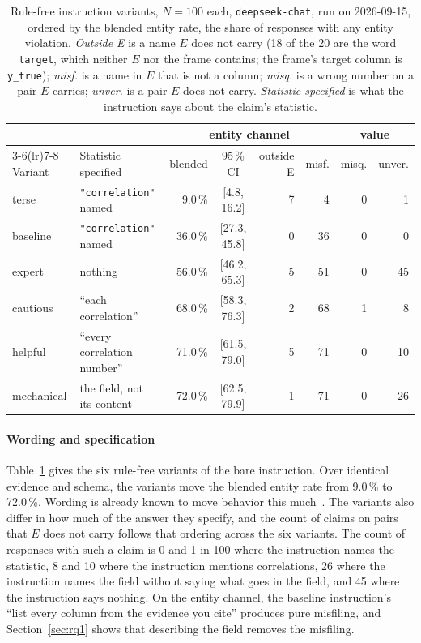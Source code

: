 \documentclass[journal]{IEEEtran}
\begin{document}
\begin{table}[!tp]
\caption{Rule-free instruction variants, $N=100$ each, \texttt{deepseek-chat},
run on 2026-09-15,
ordered by the blended entity rate, the share of responses with any entity
violation. \emph{Outside E} is a name $E$ does not carry (18 of the 20 are the
word \texttt{target}, which neither $E$ nor the frame contains; the frame's
target column is \texttt{y\_true}); \emph{misf.} is a name in $E$ that is not
a column; \emph{misq.} is a wrong number on a pair $E$ carries; \emph{unver.}
is a pair $E$ does not carry. \emph{Statistic specified} is what the
instruction says about the claim's statistic.}
\label{tab:sweep}
\centering
\begin{tabular}{@{}llrcrrrr@{}}
\toprule
& & \multicolumn{4}{c}{entity channel} & \multicolumn{2}{c}{value} \\
\cmidrule(lr){3-6}\cmidrule(lr){7-8}
Variant & Statistic specified & blended & 95\,\% CI & outside E & misf. & misq. & unver. \\
\midrule
terse      & \texttt{"correlation"} named   &  9.0\,\% & [4.8, 16.2]  & 7 &  4 & 0 & 1 \\
baseline   & \texttt{"correlation"} named   & 36.0\,\% & [27.3, 45.8] & 0 & 36 & 0 & 0 \\
expert     & nothing                        & 56.0\,\% & [46.2, 65.3] & 5 & 51 & 0 & 45 \\
cautious   & ``each correlation''           & 68.0\,\% & [58.3, 76.3] & 2 & 68 & 1 & 8 \\
helpful    & ``every correlation number''   & 71.0\,\% & [61.5, 79.0] & 5 & 71 & 0 & 10 \\
mechanical & the field, not its content     & 72.0\,\% & [62.5, 79.9] & 1 & 71 & 0 & 26 \\
\bottomrule
\end{tabular}
\end{table}

\paragraph{Wording and specification}
Table~\ref{tab:sweep} gives the six rule-free variants of the bare
instruction. Over identical evidence and schema, the variants move the blended
entity rate from 9.0\,\% to 72.0\,\%. Wording is already known to move
behavior this much~\cite{sclar2024formatspread}. The variants also differ in
how much of the answer they specify, and the count of claims on pairs that
$E$ does not carry follows that ordering across the six variants. The count of
responses with such a claim is 0 and 1 in 100 where the instruction names the statistic, 8 and 10 where
the instruction mentions correlations, 26 where the instruction names the
field without saying what goes in the field, and 45 where the instruction says
nothing. On the entity channel, the baseline instruction's ``list every column
from the evidence you cite'' produces pure misfiling, and
Section~\ref{sec:rq1} shows that describing the field removes the misfiling.
\end{document}
